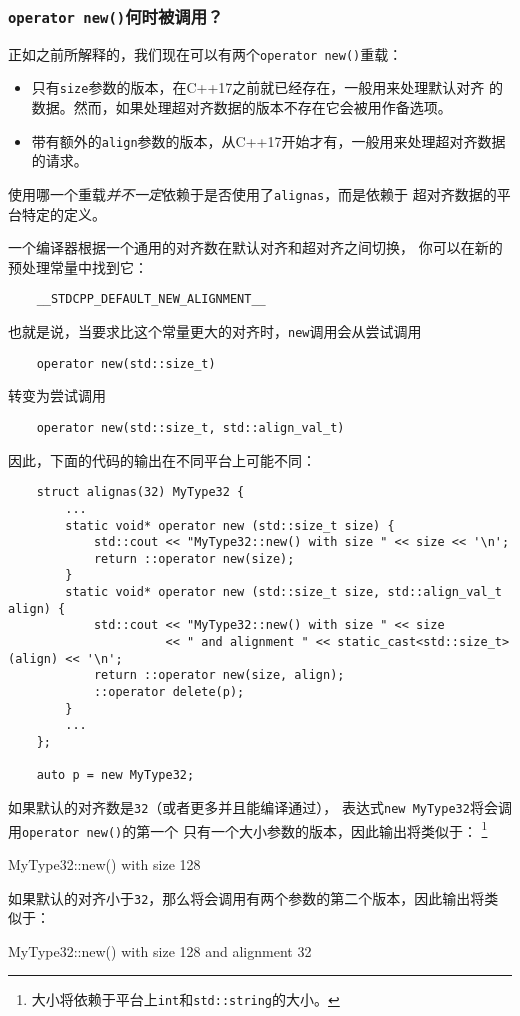 \subsubsection{\texttt{operator new()}何时被调用？}\label{ch30.2.2.1}
正如之前所解释的，我们现在可以有两个\texttt{operator new()}重载：
\begin{itemize}
    \item 只有\texttt{size}参数的版本，在C++17之前就已经存在，一般用来处理默认对齐
    的数据。然而，如果处理超对齐数据的版本不存在它会被用作备选项。
    \item 带有额外的\texttt{align}参数的版本，从C++17开始才有，一般用来处理超对齐数据的请求。
\end{itemize}
使用哪一个重载\emph{并不一定}依赖于是否使用了\texttt{alignas}，而是依赖于
超对齐数据的平台特定的定义。

一个编译器根据一个通用的对齐数在默认对齐和超对齐之间切换，
你可以在新的预处理常量中找到它：
\begin{lstlisting}
    __STDCPP_DEFAULT_NEW_ALIGNMENT__
\end{lstlisting}
也就是说，当要求比这个常量更大的对齐时，\texttt{new}调用会从尝试调用
\begin{lstlisting}
    operator new(std::size_t)
\end{lstlisting}
转变为尝试调用
\begin{lstlisting}
    operator new(std::size_t, std::align_val_t)
\end{lstlisting}
因此，下面的代码的输出在不同平台上可能不同：
\begin{lstlisting}
    struct alignas(32) MyType32 {
        ...
        static void* operator new (std::size_t size) {
            std::cout << "MyType32::new() with size " << size << '\n';
            return ::operator new(size);
        }
        static void* operator new (std::size_t size, std::align_val_t align) {
            std::cout << "MyType32::new() with size " << size
                      << " and alignment " << static_cast<std::size_t>(align) << '\n';
            return ::operator new(size, align);
            ::operator delete(p);
        }
        ...
    };

    auto p = new MyType32;
\end{lstlisting}
如果默认的对齐数是\texttt{32}（或者更多并且能编译通过），
表达式\texttt{new MyType32}将会调用\texttt{operator new()}的第一个
只有一个大小参数的版本，因此输出将类似于：
\footnote{大小将依赖于平台上\texttt{int}和\texttt{std::string}的大小。}
\begin{blacklisting}
    MyType32::new() with size 128
\end{blacklisting}
如果默认的对齐小于\texttt{32}，那么将会调用有两个参数的第二个版本，因此输出将类似于：
\begin{blacklisting}
    MyType32::new() with size 128 and alignment 32
\end{blacklisting}

